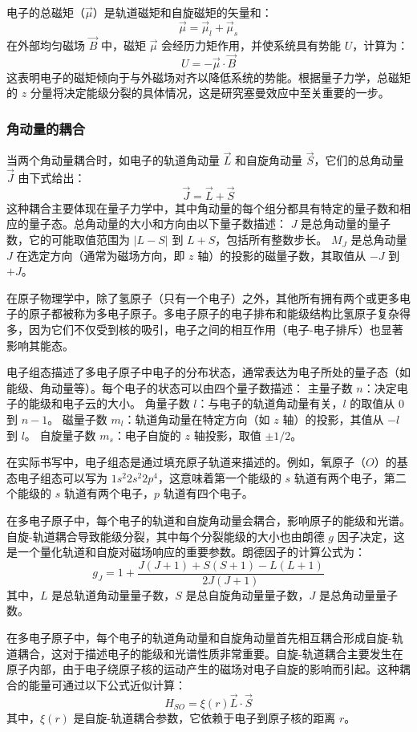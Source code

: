 \documentclass[dvipsnames, svgnames,a4paper,11pt]{article}
\begin{document}
	电子的总磁矩（\(\vec{\mu}\)）是轨道磁矩和自旋磁矩的矢量和：
	\[
	\vec{\mu} = \vec{\mu}_l + \vec{\mu}_s
	\]
	在外部均匀磁场 \(\vec{B}\) 中，磁矩 \(\vec{\mu}\) 会经历力矩作用，并使系统具有势能 \(U\)，计算为：
	\[
	U = -\vec{\mu} \cdot \vec{B}
	\]
	这表明电子的磁矩倾向于与外磁场对齐以降低系统的势能。根据量子力学，总磁矩的 \(z\) 分量将决定能级分裂的具体情况，这是研究塞曼效应中至关重要的一步。
	
	\subsubsection{角动量的耦合}
	
	当两个角动量耦合时，如电子的轨道角动量 \(\vec{L}\) 和自旋角动量 \(\vec{S}\)，它们的总角动量 \(\vec{J}\) 由下式给出：
	\[
	\vec{J} = \vec{L} + \vec{S}
	\]
	这种耦合主要体现在量子力学中，其中角动量的每个组分都具有特定的量子数和相应的量子态。总角动量的大小和方向由以下量子数描述：
	\(J\) 是总角动量的量子数，它的可能取值范围为 \(|L - S|\) 到 \(L + S\)，包括所有整数步长。
	\(M_J\) 是总角动量 \(J\) 在选定方向（通常为磁场方向，即 \(z\) 轴）的投影的磁量子数，其取值从 \(-J\) 到 \(+J\)。
	
	在原子物理学中，除了氢原子（只有一个电子）之外，其他所有拥有两个或更多电子的原子都被称为多电子原子。多电子原子的电子排布和能级结构比氢原子复杂得多，因为它们不仅受到核的吸引，电子之间的相互作用（电子-电子排斥）也显著影响其能态。
	
	电子组态描述了多电子原子中电子的分布状态，通常表达为电子所处的量子态（如能级、角动量等）。每个电子的状态可以由四个量子数描述：
	主量子数 \(n\)：决定电子的能级和电子云的大小。
	角量子数 \(l\)：与电子的轨道角动量有关，\(l\) 的取值从 0 到 \(n-1\)。
	磁量子数 \(m_l\)：轨道角动量在特定方向（如 \(z\) 轴）的投影，其值从 \(-l\) 到 \(l\)。
	自旋量子数 \(m_s\)：电子自旋的 \(z\) 轴投影，取值 \(\pm 1/2\)。
	
	在实际书写中，电子组态是通过填充原子轨道来描述的。例如，氧原子（\(O\)）的基态电子组态可以写为 \(1s^2 2s^2 2p^4\)，这意味着第一个能级的 \(s\) 轨道有两个电子，第二个能级的 \(s\) 轨道有两个电子，\(p\) 轨道有四个电子。
	
	在多电子原子中，每个电子的轨道和自旋角动量会耦合，影响原子的能级和光谱。自旋-轨道耦合导致能级分裂，其中每个分裂能级的大小也由朗德 \(g\) 因子决定，这是一个量化轨道和自旋对磁场响应的重要参数。朗德因子的计算公式为：
	\[
	g_J = 1 + \frac{J(J + 1) + S(S + 1) - L(L + 1)}{2J(J + 1)}
	\]
	其中，\(L\) 是总轨道角动量量子数，\(S\) 是总自旋角动量量子数，\(J\) 是总角动量量子数。
	
	在多电子原子中，每个电子的轨道角动量和自旋角动量首先相互耦合形成自旋-轨道耦合，这对于描述电子的能级和光谱性质非常重要。自旋-轨道耦合主要发生在原子内部，由于电子绕原子核的运动产生的磁场对电子自旋的影响而引起。这种耦合的能量可通过以下公式近似计算：
	\[
	H_{SO} = \xi(r) \vec{L} \cdot \vec{S}
	\]
	其中，\(\xi(r)\) 是自旋-轨道耦合参数，它依赖于电子到原子核的距离 \(r\)。
	
\end{document}
